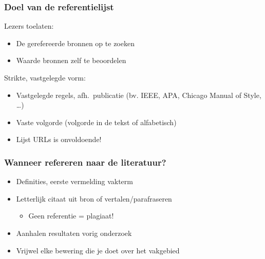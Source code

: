 \documentclass{beamer}
\begin{document}
\begin{frame}
  \frametitle{Doel van de referentielijst}

  Lezers toelaten:

  \begin{itemize}
    \item De gerefereerde bronnen op te zoeken
    \item Waarde bronnen zelf te beoordelen
  \end{itemize}

  \pause

  Strikte, vastgelegde vorm:

  \begin{itemize}
    \item Vastgelegde regels, afh.~publicatie (bv. IEEE, APA, Chicago Manual of Style, \ldots)
    \item Vaste volgorde (volgorde in de tekst of alfabetisch)
    \item Lijst URLs is onvoldoende!
  \end{itemize}

  \pause

\end{frame}

\begin{frame}
  \frametitle{Wanneer refereren naar de literatuur?}

  \begin{itemize}
    \item Definities, eerste vermelding vakterm
    \item Letterlijk citaat uit bron of vertalen/parafraseren
      \begin{itemize}
        \item Geen referentie = \alert{plagiaat!}
      \end{itemize}
    \item Aanhalen resultaten vorig onderzoek
    \item Vrijwel elke bewering die je doet over het vakgebied
  \end{itemize}

  \vfill

\end{frame}
\end{document}
